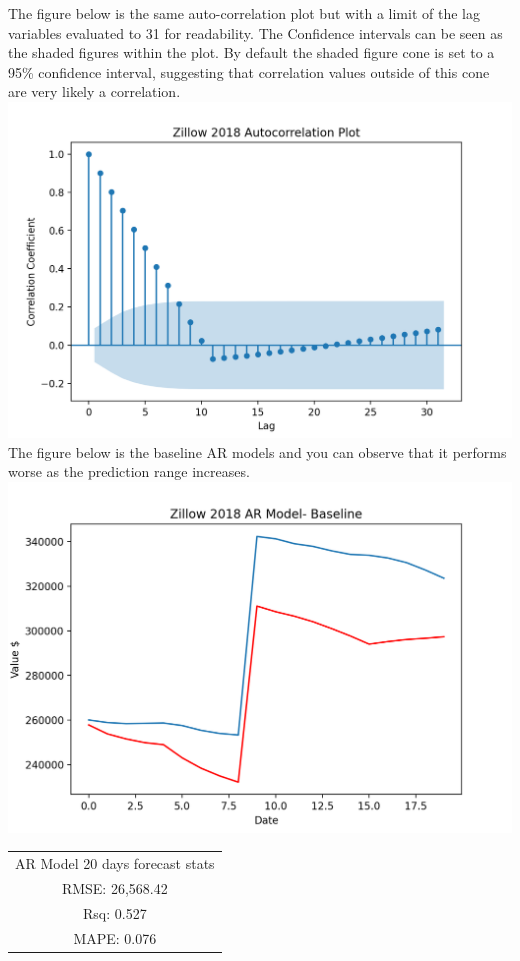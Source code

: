 \documentclass{article}
\begin{document}
	The figure below is the same auto-correlation plot but with a limit of the lag variables evaluated to 31 for readability. The Confidence intervals can be seen as the shaded figures within the plot. By default the shaded figure cone is set to a 95\% confidence interval, suggesting that correlation values outside of this cone are very likely a correlation. \\
	
	\includegraphics[scale = 0.2]{../plots/2018/zillow2018_autocorrelation2.png} \\
	
	The figure below is the baseline AR models and you can observe that it performs worse as the prediction range increases. \\
	
	\includegraphics[scale = 0.5]{../plots/2018/zillow2018_AR-model-base20.png}
	\begin{center}
    \begin{tabular}{ c }
     AR Model 20 days forecast stats \\ 
     RMSE: 26,568.42 \\  
     Rsq: 0.527 \\
     MAPE: 0.076 \\
    \end{tabular}
    \end{center}
	
\end{document}
